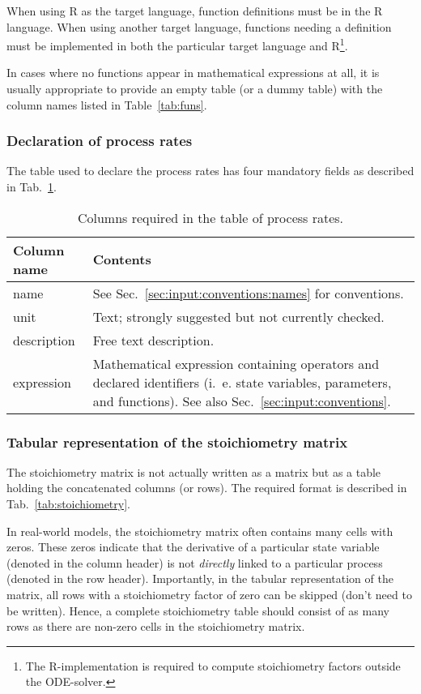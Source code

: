 \documentclass[a4paper]{article}
\begin{document}
When using R as the target language, function definitions must be in the R 
language. When using another target language, functions needing a definition 
must be implemented in both the particular target language and R\footnote{The 
R-implementation is required to compute stoichiometry factors outside the 
ODE-solver.}.

In cases where no functions appear in mathematical expressions at all, it is 
usually appropriate to provide an empty table (or a dummy table) with the column 
names listed in Table~\ref{tab:funs}.

\subsubsection{Declaration of process rates} \label{sec:input:tables:processes}

The table used to declare the process rates has four mandatory fields as described in Tab.~\ref{tab:processes}.

\begin{table}[!h]
  \caption{Columns required in the table of process rates. \label{tab:processes}}
  \begin{tabular}{lp{}} \hline\hline
    \textbf{Column name} & \textbf{Contents} \\ \hline
    name & See Sec.~\ref{sec:input:conventions:names} for conventions. \\
    unit & Text; strongly suggested but not currently checked. \\
    description & Free text description. \\
    expression & Mathematical expression containing operators and declared identifiers (i.~e. state variables, parameters, and functions). See also Sec.~\ref{sec:input:conventions}. \\
    \hline
  \end{tabular}
\end{table}

\subsubsection{Tabular representation of the stoichiometry matrix} \label{sec:input:tables:stoichiometry}

The stoichiometry matrix is not actually written as a matrix but as a table holding the concatenated columns (or rows). The required format is described in  Tab.~\ref{tab:stoichiometry}.

In real-world models, the stoichiometry matrix often contains many cells with zeros. These zeros indicate that the derivative of a particular state variable (denoted in the column header) is not \emph{directly} linked to a particular process (denoted in the row header). Importantly, in the tabular representation of the matrix, all rows with a stoichiometry factor of zero can be skipped (don't need to be written). Hence, a complete stoichiometry table should consist of as many rows as there are non-zero cells in the stoichiometry matrix.
\end{document}
